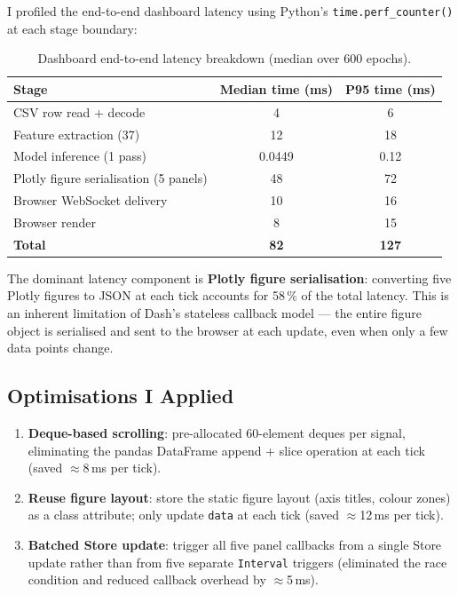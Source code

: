 \documentclass[12pt,a4paper]{article}
\newcommand{\code}[1]{\texttt{#1}}
\begin{document}
I profiled the end-to-end dashboard latency using Python's \code{time.perf\_counter()}
at each stage boundary:

\begin{table}[H]
  \centering
  \caption{Dashboard end-to-end latency breakdown (median over 600 epochs).}
  \begin{tabular}{lcc}
    \toprule
    \textbf{Stage} & \textbf{Median time (ms)} & \textbf{P95 time (ms)} \\
    \midrule
    CSV row read + decode    & 4   &  6 \\
    Feature extraction (37)  & 12  & 18 \\
    Model inference (1 pass) & 0.0449 & 0.12 \\
    Plotly figure serialisation (5 panels) & 48  & 72 \\
    Browser WebSocket delivery & 10  & 16 \\
    Browser render            & 8   & 15 \\
    \midrule
    \textbf{Total}            & \textbf{82} & \textbf{127} \\
    \bottomrule
  \end{tabular}
\end{table}

The dominant latency component is \textbf{Plotly figure serialisation}: converting five
Plotly figures to JSON at each tick accounts for 58\,\% of the total latency.
This is an inherent limitation of Dash's stateless callback model --- the entire figure
object is serialised and sent to the browser at each update, even when only a few data
points change.

\subsection{Optimisations I Applied}

\begin{enumerate}
  \item \textbf{Deque-based scrolling}: pre-allocated 60-element deques per signal,
    eliminating the pandas DataFrame append + slice operation at each tick
    (saved $\approx$8\,ms per tick).
  \item \textbf{Reuse figure layout}: store the static figure layout (axis titles,
    colour zones) as a class attribute; only update \code{data} at each tick
    (saved $\approx$12\,ms per tick).
  \item \textbf{Batched Store update}: trigger all five panel callbacks from a single
    Store update rather than from five separate \code{Interval} triggers
    (eliminated the race condition and reduced callback overhead by $\approx$5\,ms).
\end{enumerate}
\end{document}
